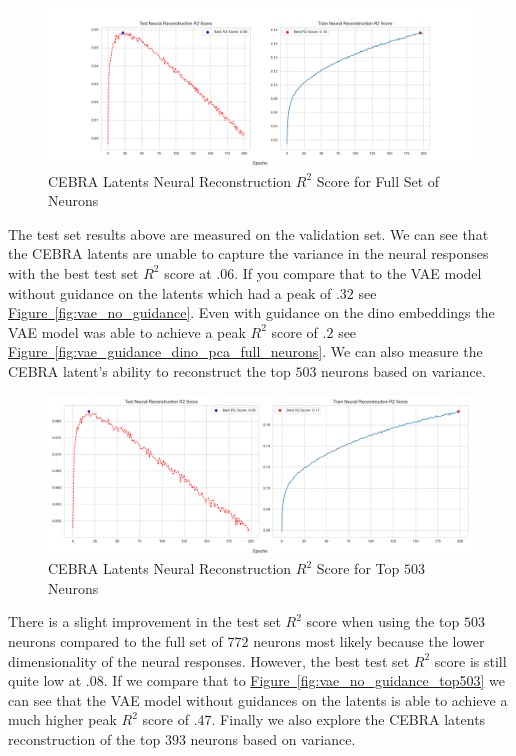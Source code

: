 \documentclass[12pt, letterpaper]{article}
\begin{document}
\begin{figure}[H]
    \centering
    \includegraphics[width=1.0\textwidth]{cebra_x_r2_772_200_epochs_3_layer.png}
    \caption{CEBRA Latents Neural Reconstruction $R^2$ Score for Full Set of Neurons}
    \label{fig:cebra_latents_neural_reconstruction_772}
\end{figure}

The test set results above are measured on the validation set. We can see that the CEBRA latents are unable to capture the variance in the neural responses with the best test set $R^2$ score at $.06$. If you compare that to the VAE model without guidance on the latents which had a peak of $.32$ see \hyperref[fig:vae_no_guidance]{Figure~\ref{fig:vae_no_guidance}}. Even with guidance on the dino embeddings the VAE model was able to achieve a peak $R^2$ score of $.2$ see \hyperref[fig:vae_guidance_dino_pca_full_neurons]{Figure~\ref{fig:vae_guidance_dino_pca_full_neurons}}. We can also measure the CEBRA latent's ability to reconstruct the top $503$ neurons based on variance.

\begin{figure}[H]
    \centering
    \includegraphics[width=1.0\textwidth]{cebra_x_r2_503_200_epochs_3_layer.png}
    \caption{CEBRA Latents Neural Reconstruction $R^2$ Score for Top $503$ Neurons}
    \label{fig:cebra_latents_neural_reconstruction_503}
\end{figure}

There is a slight improvement in the test set $R^2$ score when using the top $503$ neurons compared to the full set of $772$ neurons most likely because the lower dimensionality of the neural responses. However, the best test set $R^2$ score is still quite low at $.08$. If we compare that to \hyperref[fig:vae_no_guidance_top503]{Figure~\ref{fig:vae_no_guidance_top503}} we can see that the VAE model without guidances on the latents is able to achieve a much higher peak $R^2$ score of $.47$. Finally we also explore the CEBRA latents reconstruction of the top $393$ neurons based on variance.
\end{document}
